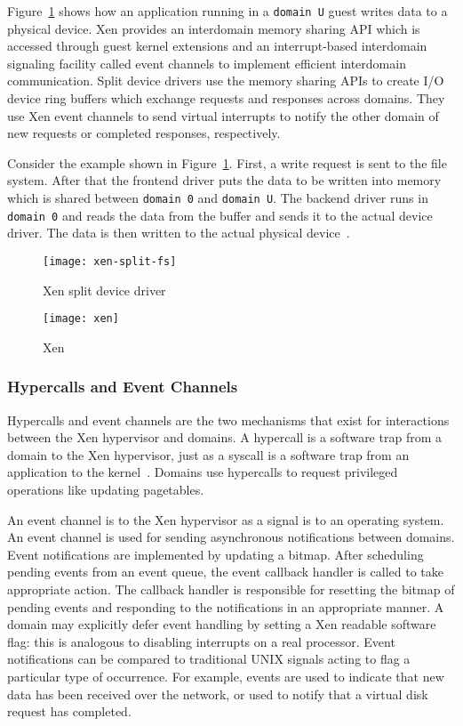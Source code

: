 Figure~\ref{xen-split2} shows how an application running in a
\texttt{domain U} guest writes data to a physical device. Xen
provides an interdomain memory sharing API which is accessed through 
guest kernel extensions and an interrupt-based interdomain signaling
facility called event channels to implement efficient interdomain
communication. Split device drivers use the memory sharing APIs to
create I/O device ring buffers which exchange requests and responses
across domains. They use Xen event channels to send virtual interrupts 
to notify the other domain of new requests or completed responses, 
respectively.

Consider the example shown in Figure~\ref{xen-split2}. First, a write
request is sent to the file system. After that the frontend driver
puts the data to be written into memory which is shared between \texttt{domain 0} and
\texttt{domain U}. The backend driver runs in \texttt{domain 0} and reads the data from the
buffer and sends it to the actual device driver. The data is then written
to the actual physical device~\cite{Chisnall:2007:DGX:1407351}.

\begin{figure}[!h]
\centering
\texttt{[image: xen-split-fs]}
\caption{Xen split device driver}
\label{xen-split2}
\end{figure}
\begin{figure}[!h]
\centering
\texttt{[image: xen]}
\caption{Xen}
\label{xen}
\end{figure}

\subsubsection*{Hypercalls and Event Channels}
Hypercalls and event channels are the two mechanisms that exist for
interactions between the Xen hypervisor and domains. A hypercall is a
software trap from a domain to the Xen hypervisor, just as a syscall is a
software trap from an application to the kernel~\cite{hypercall}. Domains
use hypercalls to request privileged operations like updating pagetables.

An event channel is to the Xen hypervisor as a signal is to an operating
system. An event channel is used for sending asynchronous notifications
between domains. Event notifications are implemented by updating a
bitmap. After scheduling pending events from an event queue, the event
callback handler is called to take appropriate action. The callback
handler is responsible for resetting the bitmap of pending events and
responding to the notifications in an appropriate manner. A domain may
explicitly defer event handling by setting a Xen readable software flag:
this is analogous to disabling interrupts on a real processor. Event
notifications can be compared to traditional UNIX signals acting to
flag a particular type of occurrence. For example, events are used to
indicate that new data has been received over the network, or used to
notify that a virtual disk request has completed.


